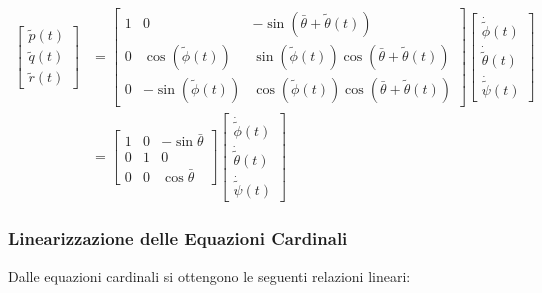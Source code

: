 \begin{equation}
    \label{eq:EulerotoVelocitaAngolareLineare}
    \begin{split}
        \begin{bmatrix}
            \widetilde{p}(t) \\
            \widetilde{q}(t) \\
            \widetilde{r}(t)
        \end{bmatrix} & = \begin{bmatrix}
                              1 & 0                          & -\sin(\bar{\theta} + \widetilde{\theta}(t))                         \\
                              0 & \cos(\widetilde{\phi}(t))  & \sin(\widetilde{\phi}(t))\cos(\bar{\theta} + \widetilde{\theta}(t)) \\
                              0 & -\sin(\widetilde{\phi}(t)) & \cos(\widetilde{\phi}(t))\cos(\bar{\theta} + \widetilde{\theta}(t))
                          \end{bmatrix}\begin{bmatrix}
                                           \dot{\widetilde{\phi}}(t)   \\
                                           \dot{\widetilde{\theta}}(t) \\
                                           \dot{\widetilde{\psi}}(t)
                                       \end{bmatrix} \\ &= \begin{bmatrix}
            1 & 0 & -\sin\bar{\theta} \\
            0 & 1 & 0                 \\
            0 & 0 & \cos\bar{\theta}
        \end{bmatrix}\begin{bmatrix}
            \dot{\widetilde{\phi}}(t)   \\
            \dot{\widetilde{\theta}}(t) \\
            \dot{\widetilde{\psi}}(t)
        \end{bmatrix}
    \end{split}
\end{equation}
\subsubsection{Linearizzazione delle Equazioni Cardinali}
Dalle equazioni cardinali si ottengono le seguenti relazioni lineari:

